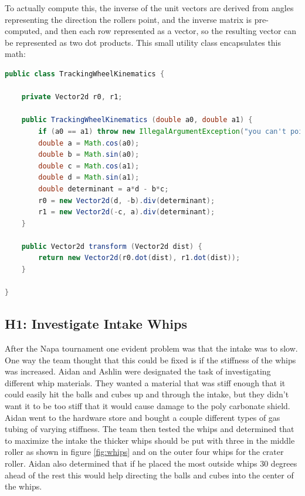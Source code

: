 \documentclass{article}
\begin{document}
To actually compute this, the inverse of the unit vectors are derived from angles representing the direction the rollers point, and the inverse matrix is pre-computed, and then each row represented as a vector, so the resulting vector can be represented as two dot products. This small utility class encapsulates this math:

\begin{lstlisting}[language=Java]
public class TrackingWheelKinematics {

    private Vector2d r0, r1;

    public TrackingWheelKinematics (double a0, double a1) {
        if (a0 == a1) throw new IllegalArgumentException("you can't point them in the same direction silly!!!");
        double a = Math.cos(a0);
        double b = Math.sin(a0);
        double c = Math.cos(a1);
        double d = Math.sin(a1);
        double determinant = a*d - b*c;
        r0 = new Vector2d(d, -b).div(determinant);
        r1 = new Vector2d(-c, a).div(determinant);
    }

    public Vector2d transform (Vector2d dist) {
        return new Vector2d(r0.dot(dist), r1.dot(dist));
    }

}
\end{lstlisting}

\subsection{H1: Investigate Intake Whips}

After the Napa tournament one evident problem was that the intake was to slow. One way the team thought that this could be fixed is if the stiffness of the whips was increased. Aidan and Ashlin were designated the task of investigating different whip materials. They wanted a material that was stiff enough that it could easily hit the balls and cubes up and through the intake, but they didn't want it to be too stiff that it would cause damage to the poly carbonate shield. Aidan went to the hardware store and bought a couple different types of gas tubing of varying stiffness. The team then tested the whips and determined that to maximize the intake the thicker whips should be put with three in the middle roller as shown in figure \ref{fig:whips} and on the outer four whips for the crater roller. Aidan also determined that if he placed the most outside whips 30 degrees ahead of the rest this would help directing the balls and cubes into the center of the whips.
\end{document}
